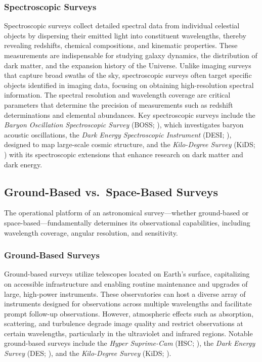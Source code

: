 \subsubsection{Spectroscopic Surveys}

Spectroscopic surveys collect detailed spectral data from individual celestial objects by dispersing their emitted light into constituent wavelengths, thereby revealing redshifts, chemical compositions, and kinematic properties. These measurements are indispensable for studying galaxy dynamics, the distribution of dark matter, and the expansion history of the Universe. Unlike imaging surveys that capture broad swaths of the sky, spectroscopic surveys often target specific objects identified in imaging data, focusing on obtaining high-resolution spectral information. The spectral resolution and wavelength coverage are critical parameters that determine the precision of measurements such as redshift determinations and elemental abundances. Key spectroscopic surveys include the \textit{Baryon Oscillation Spectroscopic Survey} (BOSS; \citealt{2013AJ....145...10D}), which investigates baryon acoustic oscillations, the \textit{Dark Energy Spectroscopic Instrument} (DESI; \citealt{2016arXiv161100036D}), designed to map large-scale cosmic structure, and the \textit{Kilo-Degree Survey} (KiDS; \citealt{2013Msngr.154...44D}) with its spectroscopic extensions that enhance research on dark matter and dark energy.

\subsection{Ground-Based vs.\ Space-Based Surveys}

The operational platform of an astronomical survey—whether ground-based or space-based—fundamentally determines its observational capabilities, including wavelength coverage, angular resolution, and sensitivity.

\subsubsection{Ground-Based Surveys}
Ground-based surveys utilize telescopes located on Earth's surface, capitalizing on accessible infrastructure and enabling routine maintenance and upgrades of large, high-power instruments. These observatories can host a diverse array of instruments designed for observations across multiple wavelengths and facilitate prompt follow-up observations. However, atmospheric effects such as absorption, scattering, and turbulence degrade image quality and restrict observations at certain wavelengths, particularly in the ultraviolet and infrared regions. Notable ground-based surveys include the \emph{Hyper Suprime-Cam} (HSC; \citealt{2018PASJ...70S...4A}), the \emph{Dark Energy Survey} (DES; \citealt{2018ApJS..239...18A}), and the \emph{Kilo-Degree Survey} (KiDS; \citealt{2013Msngr.154...44D}).

